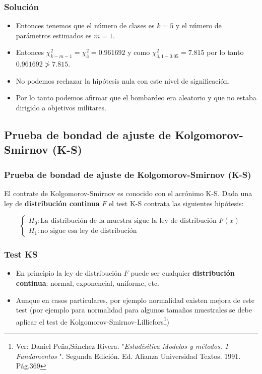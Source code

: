 \begin{frame}
\frametitle{Solución}
\begin{itemize}
\item  Entonces tenemos que el número de clases es $k=5$ y  el número  de parámetros estimados es $m=1$.
\item  Entonces $\chi^2_{k-m-1}=\chi^2_{3}=  0.961692$ y como $\chi^2_{3,1-0.05}=7.815$ por lo tanto  $0.961692\not>7.815$.
\item  No podemos rechazar la hipótesis nula con este nivel de significación.
\item  Por lo tanto podemos afirmar que el bombardeo era aleatorio y que no estaba dirigido a objetivos militares.
\end{itemize}           
\end{frame}

\subsection{Prueba de bondad de ajuste de Kolgomorov-Smirnov (K-S)}

\begin{frame}        
\frametitle{Prueba de bondad de ajuste de Kolgomorov-Smirnov (K-S)}
 El contrate de Kolgomorov-Smirnov  es conocido  con el acrónimo  K-S.
 Dada una ley de \textbf{distribución continua} $F$ el test K-S contrata las siguientes hipótesis:
           
           $$\left\{ \begin {array}{ll}
           H_0: \mbox{La distribución de la muestra sigue la ley de distribución } F(x)\\
           H_1: \mbox{no sigue esa ley de distribución}\end{array}\right.$$
           
\end{frame}

\begin{frame}
\frametitle{Test KS}
\begin{itemize}
\item   En principio la ley de distribución $F$ puede ser cualquier \textbf{distribución continua}: normal, exponencial, uniforme, etc.
\item  Aunque en casos particulares, por ejemplo normalidad existen mejora de este test (por ejemplo para normalidad para algunos tamaños muestrales se debe aplicar el test de Kolgomorov-Smirnov-Lilliefors\footnote{Ver: Daniel Peña,Sánchez Rivera. "\emph{Estadísitica Modelos y métodos. 1 Fundamentos }". Segunda Edición. Ed.  Alianza Universidad Textos. 1991. Pág.369})
\end{itemize}
\end{frame}


